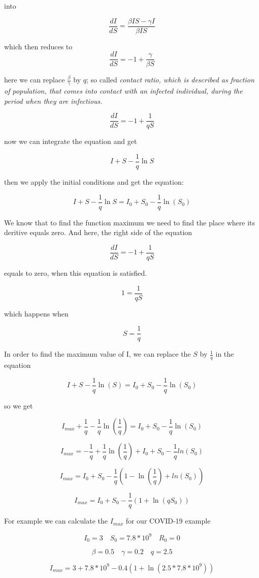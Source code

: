 \documentclass[nostrict]{szablonPG}
\begin{document}
into 

\[\frac{dI}{dS} = \frac{\beta I S - \gamma I}{\beta I S}\]

which then reduces to 
\[\frac{dI}{dS} = -1 + \frac{\gamma}{\beta S}\]

here we can replace $\frac{\beta}{\gamma}$ by $q$; so called \it{contact ratio}, which is described as fraction of population, that comes into contact with an infected individual, during the period when they are infectious.

\[\frac{dI}{dS} = -1 + \frac{1}{q S}\]

now we can integrate the equation and get

\[I + S - \frac{1}{q} \ln{S}\]

then we apply the initial conditions and get the equation:

\[I + S - \frac{1}{q} \ln{S} = I_0 + S_0 - \frac{1}{q} \ln(S_0)\]

We know that to find the function maximum we need to find the place where its deritive equals zero. And here, the right side of the equation 

\[\frac{dI}{dS} = -1 + \frac{1}{q S}\]

equals to zero, when this equation is satisfied.

\[1 = \frac{1}{q S}\]

which happens when 

\[S = \frac{1}{q}\]

In order to find the maximum value of I, we can replace the $S$ by $\frac{1}{q}$ in the equation

\[I + S - \frac{1}{q} \ln(S) = I_0 + S_0 - \frac{1}{q} \ln(S_0)\]

so we get

\[I_{max} + \frac{1}{q} - \frac{1}{q} \ln(\frac{1}{q}) = I_0 + S_0 - \frac{1}{q} \ln(S_0)\]

\[I_{max} = - \frac{1}{q} + \frac{1}{q}\ln(\frac{1}{q}) + I_0 + S_0 -\frac{1}{q}ln(S_0)\]

\[I_{max} = I_0 + S_0 - \frac{1}{q} ( 1 - \ln(\frac{1}{q}) + ln(S_0))\]

\[I_{max} = I_0 + S_0 - \frac{1}{q} ( 1 + \ln(q S_0))\]

For example we can calculate the $I_{max}$ for our COVID-19 example 

\[I_0 = 3 \quad S_0 = 7.8 * 10^9 \quad R_0 = 0\]

\[\beta = 0.5 \quad \gamma = 0.2 \quad q = 2.5\]

\[I_{max} = 3 + 7.8 * 10^9 - 0.4 ( 1 + \ln(2.5 * 7.8 * 10^9))\]
\end{document}
